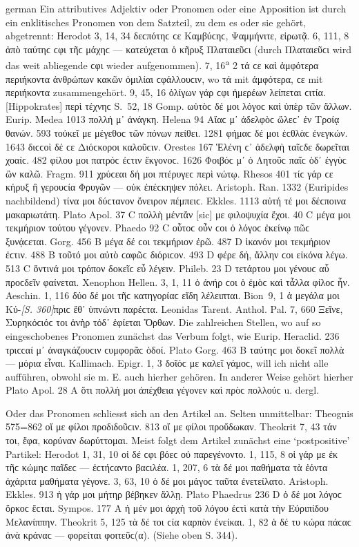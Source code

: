 \begin{otherlanguage*}{german}
Ein attributives Adjektiv oder Pronomen oder eine Apposition ist durch ein enklitisches Pronomen von dem Satzteil, zu dem es oder sie gehört, abgetrennt: Herodot 3, 14, 34 δεϲπότηϲ ϲε Καμβύϲηϲ, Ψαμμήνιτε, εἰρωτᾷ. 6, 111, 8 ἀπὸ ταύτηϲ ϲφι τῆϲ μάχηϲ — κατεύχεται ὁ κῆρυξ Πλαταιεῦϲι (durch Πλαταιεῦϲι wird das weit abliegende ϲφι wieder aufgenommen). 7, 16\textsuperscript{a} 2 τά ϲε καὶ ἀμφότερα περιήκοντα ἀνθρώπων κακῶν ὁμιλίαι ϲφάλλουϲιν, wo τά mit ἀμφότερα, ϲε mit περιήκοντα zusammengehört. 9, 45, 16 ὀλίγων γάρ ϲφι ἡμερέων λείπεται ϲιτία. [Hippokrates] περὶ τέχνηϲ S.~52, 18 Gomp. ωὑτὸϲ δέ μοι λόγοϲ καὶ ὑπὲρ τῶν ἄλλων. Eurip. Medea 1013 πολλή μ᾽ ἀνάγκη. Helena 94 Αἴαϲ μ᾽ ἀδελφὸϲ ὤλεϲ᾽ ἐν Τροίᾳ θανών. 593 τοὐκεῖ με μέγεθοϲ τῶν πόνων πείθει. 1281 φήμαϲ δέ μοι ἐϲθλὰϲ ἐνεγκών. 1643 διϲϲοὶ δέ ϲε Διόϲκοροι καλοῦϲιν. Orestes 167 Ἑλένη ϲ᾽ ἀδελφὴ ταῖϲδε δωρεῖται χοαίϲ. 482 φίλου μοι πατρόϲ ἐϲτιν ἔκγονοϲ. 1626 Φοιβόϲ μ᾽ ὁ Λητοῦϲ παῖϲ ὁδ᾽ ἐγγὺϲ ὢν καλῶ. Fragm. 911 χρύϲεαι δή μοι πτέρυγεϲ περὶ νώτῳ. Rhesos 401 τίϲ γάρ ϲε κήρυξ ἢ γερουϲία Φρυγῶν — οὐκ ἐπέϲκηψεν πόλει. Aristoph. Ran. 1332 (Euripides nachbildend) τίνα μοι δύϲτανον ὄνειρον πέμπειϲ. Ekkles. 1113 αὐτή τέ μοι δέϲποινα μακαριωτάτη. Plato Apol. 37 C πολλὴ μέντἄν [sic] με φιλοψυχία ἔχοι. 40 C μέγα μοι τεκμήριον τούτου γέγονεν. Phaedo 92 C οὗτοϲ οὖν ϲοι ὁ λόγοϲ ἐκείνῳ πῶϲ ξυνᾴϲεται. Gorg. 456 Β μέγα δέ ϲοι τεκμήριον ἐρῶ. 487 D ἱκανόν μοι τεκμήριον ἐϲτιν. 488 Β τοῦτό μοι αὐτὸ ϲαφῶϲ διόριϲον. 493 D φέρε δή, ἄλλην ϲοι εἰκόνα λέγω. 513 C ὅντινά μοι τρόπον δοκεῖϲ εὖ λέγειν. Phileb. 23 D τετάρτου μοι γένουϲ αὖ προϲδεῖν φαίνεται. Xenophon Hellen. 3, 1, 11 ὁ ἀνήρ ϲοι ὁ ἐμὸϲ καὶ τἆλλα φίλοϲ ἦν. Aeschin. 1, 116 δύο δέ μοι τῆϲ κατηγορίαϲ εἴδη λέλειπται. Bion~9, 1 ἁ μεγάλα μοι Κύ-\hypertarget{p360}{\emph{[S. 360]}}\label{p360}πριϲ ἔθ᾽ ὑπνώντι παρέϲτα. Leonidas Tarent. Anthol. Pal. 7, 660 Ξεῖνε, Συρηκόϲιόϲ τοι ἀνὴρ τόδ᾽ ἐφίεται Ὄρθων. Die zahlreichen Stellen, wo auf so eingeschobenes Pronomen zunächst das Verbum folgt, wie Eurip. Heraclid. 236 τριϲϲαί μ᾽ ἀναγκάζουϲιν ϲυμφορᾶϲ ὁδοί. Plato Gorg. 463 B ταύτηϲ μοι δοκεῖ πολλὰ — μόρια εἶναι. Kallimach. Epigr. 1, 3 δοῖόϲ με καλεῖ γάμοϲ, will ich nicht alle aufführen, obwohl sie m. E. auch hierher gehören. In anderer Weise gehört hierher Plato Apol. 28 A ὅτι πολλή μοι ἀπέχθεια γέγονεν καὶ πρὸϲ πολλούϲ u. dergl.

Oder das Pronomen schliesst sich an den Artikel an. Selten unmittelbar: The\-ognis 575=862 οἵ με φίλοι προδιδοῦϲιν. 813 οἵ με φίλοι προὔδωκαν. Theokrit 7, 43 τάν τοι, ἔφα, κορύναν δωρύττομαι. Meist folgt dem Artikel zunächst eine ‘postpositive’ Partikel: Herodot 1, 31, 10 οἱ δέ ϲφι βόεϲ οὐ παρεγένοντο. 1, 115, 8 οἱ γάρ με ἐκ τῆϲ κώμηϲ παῖδεϲ — ἐϲτήϲαντο βαϲιλέα. 1, 207, 6 τὰ δέ μοι παθήματα τὰ ἐόντα ἀχάριτα μαθήματα γέγονε. 3, 63, 10 ὁ δέ μοι μάγοϲ ταῦτα ἐνετείλατο. Aristoph. Ekkles. 913 ἡ γάρ μοι μήτηρ βέβηκεν ἄλλῃ. Plato Phaedrus 236 D ὁ δέ μοι λόγοϲ ὅρκοϲ ἔϲται. Sympos. 177 Α ἡ μέν μοι ἀρχὴ τοῦ λόγου ἐϲτὶ κατὰ τὴν Εὐριπίδου Μελανίππην. Theokrit 5, 125 τὰ δέ τοι ϲία καρπὸν ἐνείκαι. 1, 82 ἁ δέ τυ κώρα πάϲαϲ ἀνὰ κράναϲ — φορείται φοιτεῦϲ(α). (Siehe oben S. 344).


\end{otherlanguage*}
